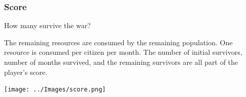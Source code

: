 \documentclass[aspectratio=169]{beamer}
\begin{document}


\begin{frame}

  \frametitle{Score}

  \begin{center}
    {\large How many survive the war?}
  \end{center}

  \begin{outline}
    \1 The remaining resources are consumed by the remaining population.
    \1 One resource is consumed per citizen per month.
    \1 The number of initial survivors, number of months survived, and the
    remaining survivors are all part of the player's score.
  \end{outline}

  \begin{center}
    \texttt{[image: ../Images/score.png]}
  \end{center}

\end{frame}

\end{document}
